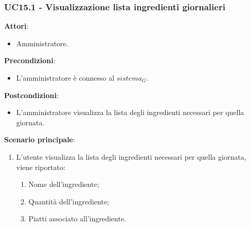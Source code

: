 \subsubsection{UC15.1 - Visualizzazione lista ingredienti giornalieri}\label{usecase:15_1}
\textbf{Attori}:
\begin{itemize}
    \item Amministratore.
\end{itemize}
\textbf{Precondizioni}:
\begin{itemize}
    \item L'amministratore è connesso al $\textit{sistema}_G$.
\end{itemize}
\textbf{Postcondizioni}:
\begin{itemize}
    \item L'amministratore visualizza la lista degli ingredienti necessari per quella giornata.
\end{itemize}
\textbf{Scenario principale}:
\begin{enumerate}
    \item L'utente visualizza la lista degli ingredienti necessari per quella giornata, viene riportato:
    \begin{enumerate}
        \item Nome dell'ingrediente;
        \item Quantità dell'ingrediente;
        \item Piatti associato all'ingrediente.
    \end{enumerate}
\end{enumerate}